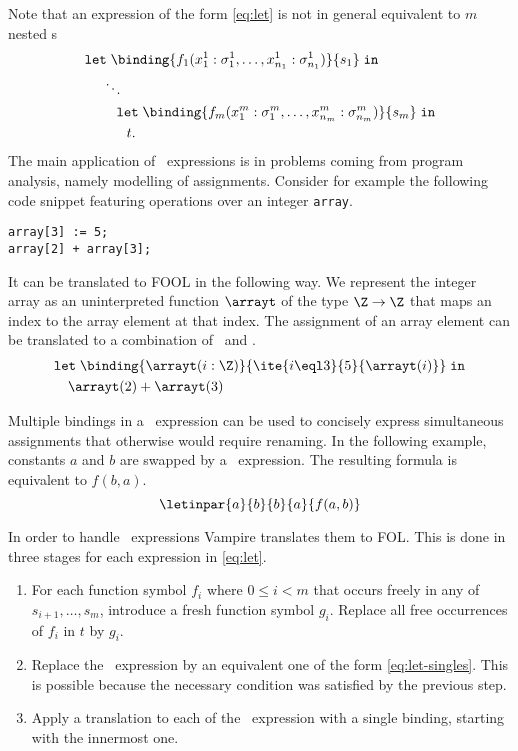 Note that an expression of the form \eqref{eq:let} is not in general equivalent to $m$ nested \LETIN s
\begin{equation}\label{eq:let-singles}
\begin{aligned}
&\mathtt{let}\;\binding{f_1(x^1_1:\sigma^1_1,\ldots,x^1_{n_1}:\sigma^1_{n_1})}{s_1}\;\mathtt{in}\\
&\quad\;\ddots\\
&\quad\quad\;\mathtt{let}\;\binding{f_m(x^m_1:\sigma^m_1,\ldots,x^m_{n_m}:\sigma^m_{n_m})}{s_m}\;\mathtt{in}\\
&\quad\quad\quad t.
\end{aligned}
\end{equation}
The main application of \LETIN\ expressions is in problems coming from program analysis, namely modelling of assignments. Consider for example the following code snippet featuring operations over an integer \verb'array'.
\begin{verbatim}
array[3] := 5;
array[2] + array[3];
\end{verbatim}
It can be translated to FOOL in the following way. We represent the integer array as an uninterpreted function $\arrayt$ of the type $\Z \to \Z$ that maps an index to the array element at that index. The assignment of an array element can be translated to a combination of \LETIN\ and \ITE.
\begin{equation}\label{eq:let-function-example}
\begin{aligned}
  &\mathtt{let}\;\binding{\arrayt(i:\Z)}{\ite{i \eql 3}{5}{\arrayt(i)}}\;\mathtt{in}\\
  &\quad\arrayt(2) + \arrayt(3)
\end{aligned}
\end{equation}



Multiple bindings in a \LETIN\ expression can be used to concisely express simultaneous assignments that otherwise would require renaming. In the following example, constants $a$ and $b$ are swapped by a \LETIN\ expression. The resulting formula is equivalent to $f(b, a)$.
\begin{equation}\label{eq:parallel-let-example}
\letinpar{a}{b}{b}{a}{f(a, b)}
\end{equation}

In order to handle \LETIN\ expressions Vampire translates them to FOL. This is done in three stages for each expression in \eqref{eq:let}.
\begin{enumerate}
  \item For each function symbol $f_i$ where $0 \leq i < m$ that occurs freely in any of $s_{i+1},\ldots,s_m$, introduce a fresh function symbol $g_i$. Replace all free occurrences of $f_i$ in $t$ by $g_i$.
  \item Replace the \LETIN\ expression by an equivalent one of the form \eqref{eq:let-singles}. This is possible because the necessary condition was satisfied by the previous step.
  \item Apply a translation to each of the \LETIN\ expression with a single binding, starting with the innermost one.
\end{enumerate}

